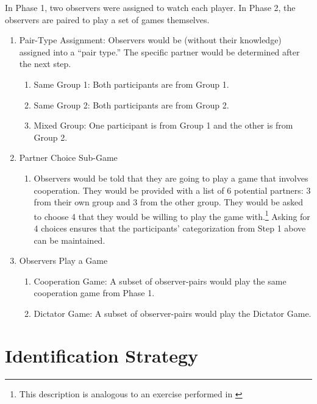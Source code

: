 \documentclass[10pt]{article}
\newif\ifdraft
\begin{document}
In Phase 1, two observers were assigned to watch each player.
In Phase 2, the observers are paired to play a set of games themselves.


\begin{enumerate}
    \item Pair-Type Assignment: Observers would be (without their knowledge) assigned into a ``pair type.'' The specific 
        partner would be determined after the next step.
        \begin{enumerate}[label=\roman*.]
            \item Same Group 1: Both participants are from Group 1.
            \item Same Group 2: Both participants are from Group 2.
            \item Mixed Group: One participant is from Group 1 and the other is from Group 2.
        \end{enumerate}
    \item Partner Choice Sub-Game
        \begin{enumerate}[label=\roman*.]
            \item Observers would be told that they are going to play a game 
                that involves cooperation. They would be provided with a list of 
                6 potential partners:
                3 from their own group and 3 from the other group.
                They would be asked to choose 4 that they 
                would be willing to play the game with.\footnote{This description is analogous to 
                an exercise performed in 
                \ifdraft(blouin2019) \else\textcite{blouin2019}\fi} 
                Asking for 4 choices
                ensures that the participants' categorization from Step 1 above 
                can be maintained.
        \end{enumerate}
    \item Observers Play a Game
        \begin{enumerate}[label=\roman*.]
            \item Cooperation Game: A subset of observer-pairs would play the same cooperation game from Phase 1. 
            \item Dictator Game: A subset of observer-pairs would play the Dictator Game.
        \end{enumerate}
\end{enumerate}

\section{Identification Strategy}
\end{document}
